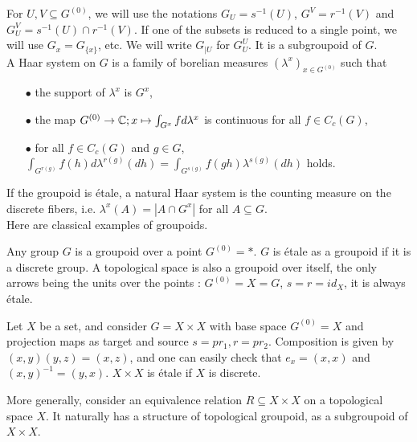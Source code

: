 For $U,V\subseteq G^{(0)}$, we will use the notations $G_U=s^{-1}(U)$, $G^V=r^{-1}(V)$ and $G_U^V=s^{-1}(U)\cap r^{-1}(V)$. If one of the subsets is reduced to a single point, we will use $G_x=G_{\{x\}}$, etc. We will write $G_{|U}$ for $G_U^U$. It is a subgroupoid of $G$.\\

A Haar system on $G$ is a family of borelian measures $(\lambda^x)_{x\in G^{(0)}}$ such that 
\begin{itemize}
\item[$\bullet$] the support of $\lambda^x$ is $G^x$, 
\item[$\bullet$] the map $G^{(0)} \rightarrow \mathbb C; x\mapsto \int_{G^x} f d\lambda^x$ is continuous for all $f\in C_c(G)$,
\item[$\bullet$] for all $f\in C_c(G)$ and $g\in G$, $\int_{G^{r(g)}} f(h) d\lambda^{r(g)}(dh)= \int_{G^{s(g)}} f(gh) \lambda^{s(g)}(dh)$ holds.
\end{itemize}

If the groupoid is étale, a natural Haar system is the counting measure on the discrete fibers, i.e. $\lambda^x(A) = |A\cap G^x|$ for all $A\subseteq G$.\\

Here are classical examples of groupoids.

\begin{Expl} Any group $G$ is a groupoid over a point $G^{(0)}=*$. $G$ is étale as a groupoid if it is a discrete group. A topological space is also a groupoid over itself, the only arrows being the units over the points : $G^{(0)} = X = G$, $s=r=id_X$, it is always étale.
\end{Expl}

\begin{Expl} Let $X$ be a set, and consider $G=X\times X$ with base space $G^{(0)}=X$ and projection maps as target and source $s=pr_1, r=pr_2$. Composition is given by $(x,y)(y,z)= (x,z)$, and one can easily check that $e_x=(x,x)$ and $(x,y)^{-1} = (y,x)$. $X\times X$ is étale if $X$ is discrete.
\end{Expl}

\begin{Expl} More generally, consider an equivalence relation $R \subseteq X\times X$ on a topological space $X$. It naturally has a structure of topological groupoid, as a subgroupoid of $X\times X$. 
\end{Expl}

